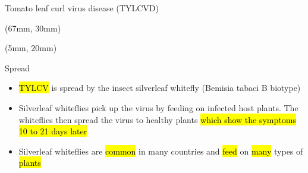 \begin{frame}{Tomato leaf curl virus disease (TYLCVD)}
    \begin{textblock*}{60mm}(67mm, 30mm)
    \end{textblock*}
    \begin{textblock*}{55mm}(5mm, 20mm)
        \begin{greenbox}{Spread}
            \begin{itemize}[<+->]
                \item
                    \hl{TYLCV} is spread by the insect 
                    silverleaf whitefly (Bemisia tabaci 
                    B biotype)
                \item
                    Silverleaf whiteflies pick up the 
                    virus by feeding on infected host 
                    plants. The whiteflies then 
                    spread the virus to healthy plants 
                    \hl{ which show the symptoms 
                    10 to 21 days later}
                \item
                    Silverleaf whiteflies are 
                    \hl{common} in many countries and 
                    \hl{feed} on \hl{many} types of 
                    \hl{plants}
            \end{itemize}
        \end{greenbox}
    \end{textblock*}
\end{frame}
